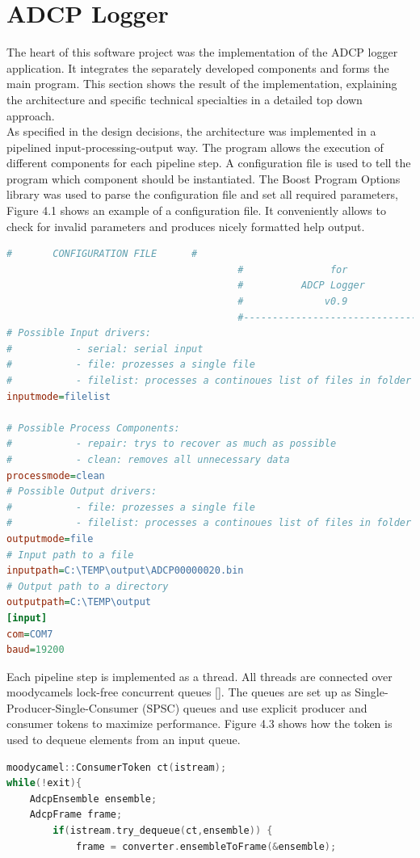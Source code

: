 \section{ADCP Logger}
The heart of this software project was the implementation of the ADCP logger application. It integrates the separately developed components and forms the main program. This section shows the result of the implementation, explaining the architecture and specific technical specialties in a detailed top down approach.\\
As specified in the design decisions, the architecture was implemented in a pipelined input-processing-output way. The program allows the execution of different components for each pipeline step. A configuration file is used to tell the program which component should be instantiated. The Boost Program Options library was used to parse the configuration file and set all required parameters, Figure 4.1 shows an example of a configuration file. It conveniently allows to check for invalid parameters and produces nicely formatted help output.
\begin{lstlisting}[language={Ini}, caption=A Snippet of a configuration file for the ADCP logger application.]
                                        #       CONFIGURATION FILE      #
                                        #               for             #
                                        #          ADCP Logger          #
                                        #              v0.9             #
                                        #-------------------------------#
# Possible Input drivers:
#           - serial: serial input
#           - file: prozesses a single file
#           - filelist: processes a continoues list of files in folder
inputmode=filelist

# Possible Process Components:
#           - repair: trys to recover as much as possible
#           - clean: removes all unnecessary data
processmode=clean
# Possible Output drivers:
#           - file: prozesses a single file
#           - filelist: processes a continoues list of files in folder
outputmode=file
# Input path to a file
inputpath=C:\TEMP\output\ADCP00000020.bin
# Output path to a directory
outputpath=C:\TEMP\output
[input]
com=COM7
baud=19200
\end{lstlisting}

Each pipeline step is implemented as a thread. All threads are connected over moodycamels lock-free concurrent queues []. The queues are set up as Single-Producer-Single-Consumer (SPSC) queues and use explicit producer and consumer tokens to maximize performance. Figure 4.3 shows how the token is used to dequeue elements from an input queue.
\begin{lstlisting}[language=C++, caption=Code snippet showing the use of consumer tokens.]
moodycamel::ConsumerToken ct(istream);
while(!exit){
    AdcpEnsemble ensemble;
    AdcpFrame frame;
        if(istream.try_dequeue(ct,ensemble)) {
            frame = converter.ensembleToFrame(&ensemble);
\end{lstlisting}

